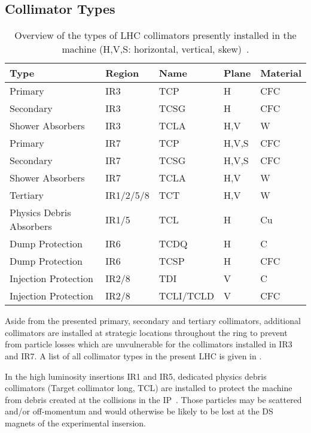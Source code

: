 \subsection{Collimator Types} \label{chap:collimator_types}
%
\begin{table}[b]
\centering
\caption{Overview of the types of LHC collimators presently installed in the machine (H,V,S: horizontal, vertical, skew)~\citedr.}
\label{tab:ctypes}
\small
\begin{tabular}{lllll}
Type                 & Region    & Name      & Plane & Material \\ \toprule
Primary              & IR3       & TCP       & H     & CFC      \\
Secondary            & IR3       & TCSG      & H     & CFC      \\
Shower Absorbers     & IR3       & TCLA      & H,V   & W        \\ \midrule
Primary              & IR7       & TCP       & H,V,S & CFC      \\
Secondary            & IR7       & TCSG      & H,V,S & CFC      \\
Shower Absorbers     & IR7       & TCLA      & H,V   & W        \\ \midrule
Tertiary             & IR1/2/5/8 & TCT       & H,V   & W        \\
Physics Debris Absorbers    & IR1/5     & TCL       & H     & Cu       \\ \midrule
Dump Protection      & IR6       & TCDQ      & H     & C        \\
Dump Protection      & IR6       & TCSP      & H     & CFC      \\ \midrule
Injection Protection & IR2/8     & TDI       & V     & C        \\
Injection Protection & IR2/8     & TCLI/TCLD & V     & CFC      \\ \bottomrule
\end{tabular}
\end{table}

Aside from the presented primary, secondary and tertiary collimators, additional collimators are installed at strategic locations throughout the ring to prevent from particle losses which are unvulnerable for the collimators installed in IR3 and IR7. A list of all collimator types in the present LHC is given in .

In the high luminosity insertions IR1 and IR5, dedicated physics debris collimators (Target collimator long, TCL) are installed to protect the machine from debris created at the collisions in the IP~\cite{assmann:chamonixXIV}. Those particles may be scattered and/or off-momentum and would otherwise be likely to be lost at the DS magnets of the experimental insersion.

